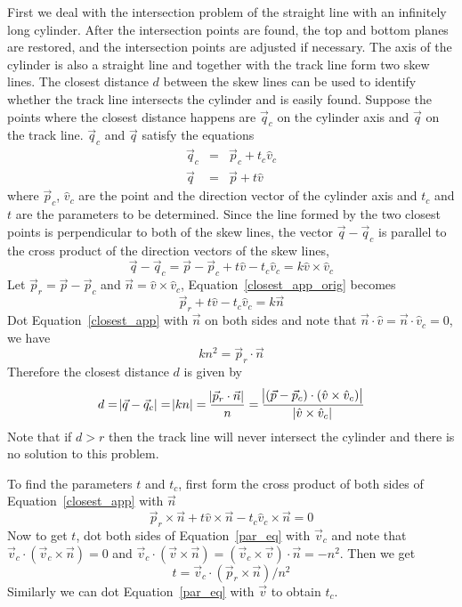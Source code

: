 First we deal with the intersection problem of the straight line with an infinitely long cylinder. After the intersection points are found, the top and bottom planes are restored, and the intersection points are adjusted if necessary. The axis of the cylinder is also a straight line and together with the track line form two skew lines. The closest distance $d$ between the skew lines can be used to identify whether the track line intersects the cylinder and is easily found. Suppose the points where the closest distance happens are $\vec{q}_c$ on the cylinder axis and $\vec{q}$ on the track line. $\vec{q}_c$ and $\vec{q}$ satisfy the equations
\begin{eqnarray}
	\vec{q}_c&=&\vec{p}_c+t_c\hat{v}_c \\
	\vec{q}&=&\vec{p}+t\hat{v}
\end{eqnarray}
where $\vec{p}_c$, $\hat{v}_c$ are the point and the direction vector of the cylinder axis and $t_c$ and $t$ are the parameters to be determined. Since the line formed by the two closest points is perpendicular to both of the skew lines, the vector $\vec{q}-\vec{q}_c$ is parallel to the cross product of the direction vectors of the skew lines,
\begin{equation}\label{closest_app_orig}
	\vec{q}-\vec{q}_c=\vec{p}-\vec{p}_c+t\hat{v}-t_c\hat{v}_c=k\hat{v}\times\hat{v}_c
\end{equation}
Let $\vec{p}_r=\vec{p}-\vec{p}_c$ and $\vec{n}=\hat{v}\times\hat{v}_c$, Equation~\ref{closest_app_orig} becomes
\begin{equation}\label{closest_app}
	\vec{p}_r+t\hat{v}-t_c\hat{v}_c=k\vec{n}
\end{equation}
Dot Equation~\ref{closest_app} with $\vec{n}$ on both sides and note that $\vec{n}\cdot \hat{v}=\vec{n}\cdot \hat{v}_c=0$, we have
\begin{equation}
	kn^2=\vec{p}_r\cdot \vec{n}
\end{equation}
Therefore the closest distance $d$ is given by
\begin{equation}
	d=\abs{\vec{q}-\vec{q}_c}=\abs{kn}=\frac{\abs{\vec{p}_r\cdot \vec{n}}}{n}=\frac{\abs{(\vec{p}-\vec{p}_c)\cdot (\hat{v}\times\hat{v}_c)}}{\abs{\hat{v}\times\hat{v}_c}}
\end{equation}
Note that if $d>r$ then the track line will never intersect the cylinder and there is no solution to this problem.

To find the parameters $t$ and $t_c$, first form the cross product of both sides of Equation~\ref{closest_app} with $\vec{n}$
\begin{equation}\label{par_eq}
	\vec{p}_r\times \vec{n}+t\hat{v}\times \vec{n}-t_c\hat{v}_c\times \vec{n}=0
\end{equation}
Now to get $t$, dot both sides of Equation~\ref{par_eq} with $\vec{v}_c$ and note that $\vec{v}_c\cdot (\vec{v}_c\times \vec{n})=0$ and $\vec{v}_c\cdot (\vec{v}\times \vec{n})=(\vec{v}_c\times \vec{v})\cdot \vec{n}=-n^2$. Then we get
\begin{equation}
	t=\vec{v}_c\cdot (\vec{p}_r\times \vec{n})/n^2
\end{equation}
Similarly we can dot Equation~\ref{par_eq} with $\vec{v}$ to obtain $t_c$.

